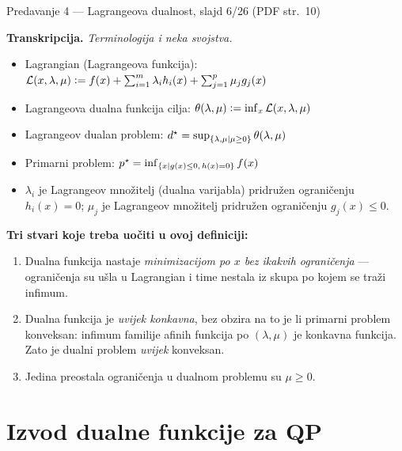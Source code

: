 \begin{izvor}{Predavanje 4 --- Lagrangeova dualnost, slajd 6/26 (PDF str.~10)}

\textbf{Transkripcija.} \emph{Terminologija i neka svojstva.}
\begin{itemize}[nosep,leftmargin=*]
  \item Lagrangian (Lagrangeova funkcija):
        $\mathcal{L}(x,\lambda,\mu) \mathrel{\vcentcolon=} f(x) + \sum_{i=1}^{m}\lambda_i h_i(x) + \sum_{j=1}^{p}\mu_j g_j(x)$
  \item Lagrangeova dualna funkcija cilja:
        $\theta(\lambda,\mu) \mathrel{\vcentcolon=} \inf_x \mathcal{L}(x,\lambda,\mu)$
  \item Lagrangeov dualan problem:
        $d^{\star} = \sup_{\{\lambda,\mu \mid \mu \geq 0\}} \theta(\lambda,\mu)$
  \item Primarni problem: $p^{\star} = \inf_{\{x \mid g(x) \leq 0,\, h(x) = 0\}} f(x)$
  \item $\lambda_i$ je Lagrangeov množitelj (dualna varijabla) pridružen
        ograničenju $h_i(x) = 0$;
        $\mu_j$ je Lagrangeov množitelj pridružen ograničenju $g_j(x) \leq 0$.
\end{itemize}

\textbf{Tri stvari koje treba uočiti u ovoj definiciji:}
\begin{enumerate}[nosep,leftmargin=*]
  \item Dualna funkcija nastaje \emph{minimizacijom po $x$ bez ikakvih
        ograničenja} --- ograničenja su ušla u Lagrangian i time nestala iz skupa
        po kojem se traži infimum.
  \item Dualna funkcija je \emph{uvijek konkavna}, bez obzira na to je li primarni
        problem konveksan: infimum familije afinih funkcija po $(\lambda,\mu)$ je
        konkavna funkcija. Zato je dualni problem \emph{uvijek} konveksan.
  \item Jedina preostala ograničenja u dualnom problemu su $\mu \geq 0$.
\end{enumerate}
\end{izvor}

\section{Izvod dualne funkcije za QP}
\label{sec:z1e-izvod}

